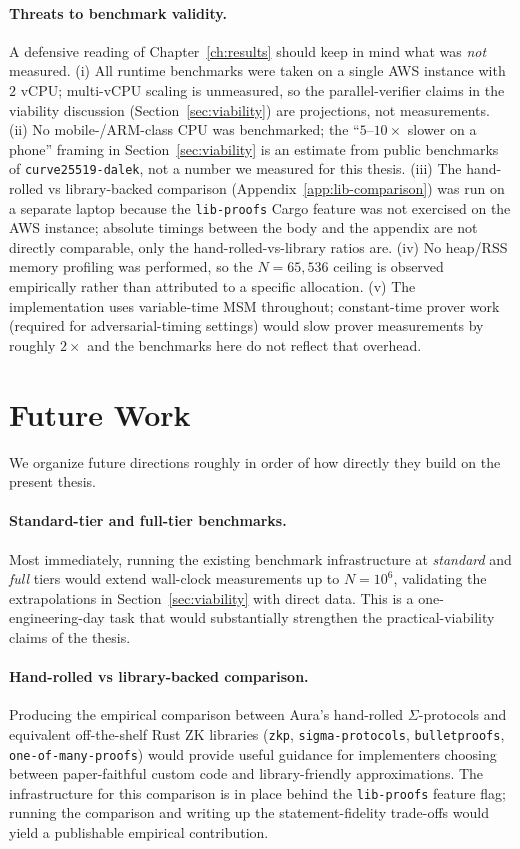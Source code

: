 \documentclass[12pt,a4paper,oneside]{report}
\begin{document}
\paragraph{Threats to benchmark validity.}
A defensive reading of Chapter~\ref{ch:results} should keep in mind
what was \emph{not} measured. (i) All runtime benchmarks were taken
on a single AWS instance with $2$ vCPU; multi-vCPU scaling is
unmeasured, so the parallel-verifier claims in the viability
discussion (Section~\ref{sec:viability}) are projections, not
measurements. (ii) No mobile-/ARM-class CPU was benchmarked; the
``$5$--$10\times$ slower on a phone'' framing in
Section~\ref{sec:viability} is an estimate from public benchmarks
of \texttt{curve25519-dalek}, not a number we measured for this
thesis. (iii) The hand-rolled vs library-backed comparison
(Appendix~\ref{app:lib-comparison}) was run on a separate laptop
because the \texttt{lib-proofs} Cargo feature was not exercised on
the AWS instance; absolute timings between the body and the
appendix are not directly comparable, only the
hand-rolled-vs-library ratios are. (iv) No heap/RSS memory
profiling was performed, so the $N = 65{,}536$ ceiling is observed
empirically rather than attributed to a specific allocation. (v)
The implementation uses variable-time MSM throughout; constant-time
prover work (required for adversarial-timing settings) would slow
prover measurements by roughly $2\times$ and the benchmarks here
do not reflect that overhead.

\section{Future Work}
\label{sec:future-work}

We organize future directions roughly in order of how directly they 
build on the present thesis.

\paragraph{Standard-tier and full-tier benchmarks.} 
Most immediately, running the existing benchmark infrastructure at 
\emph{standard} and \emph{full} tiers would extend wall-clock 
measurements up to $N = 10^6$, validating the extrapolations in 
Section~\ref{sec:viability} with direct data. This is a 
one-engineering-day task that would substantially strengthen the 
practical-viability claims of the thesis.

\paragraph{Hand-rolled vs library-backed comparison.} 
Producing the empirical comparison between Aura's hand-rolled 
$\Sigma$-protocols and equivalent off-the-shelf Rust ZK libraries 
(\texttt{zkp}, \texttt{sigma-protocols}, \texttt{bulletproofs}, 
\texttt{one-of-many-proofs}) would provide useful guidance for 
implementers choosing between paper-faithful custom code and 
library-friendly approximations. The infrastructure for this 
comparison is in place behind the \texttt{lib-proofs} feature flag; 
running the comparison and writing up the statement-fidelity 
trade-offs would yield a publishable empirical contribution.
\end{document}
